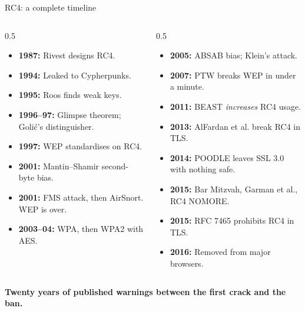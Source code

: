 \ifdefined\PRESENTATION\else\PassOptionsToClass{handout}{beamer}\fi\documentclass[aspectratio=169, lualatex]{beamer}
\begin{document}
\begin{frame}{RC4: a complete timeline}
	\begin{columns}[c]
		\begin{column}{0.5\textwidth}
			\begin{itemize}
				\item \textbf{1987:} Rivest designs RC4.
				\item \textbf{1994:} Leaked to Cypherpunks.
				\item \textbf{1995:} Roos finds weak keys.
				\item \textbf{1996--97:} Glimpse theorem; Goli\'{c}'s distinguisher.
				\item \textbf{1997:} WEP standardises on RC4.
				\item \textbf{2001:} Mantin--Shamir second-byte bias.
				\item \textbf{2001:} FMS attack, then AirSnort. WEP is over.
				\item \textbf{2003--04:} WPA, then WPA2 with AES.
			\end{itemize}
		\end{column}
		\begin{column}{0.5\textwidth}
			\begin{itemize}
				\item \textbf{2005:} ABSAB bias; Klein's attack.
				\item \textbf{2007:} PTW breaks WEP in under a minute.
				\item \textbf{2011:} BEAST \emph{increases} RC4 usage.
				\item \textbf{2013:} AlFardan et al. break RC4 in TLS.
				\item \textbf{2014:} POODLE leaves SSL 3.0 with nothing safe.
				\item \textbf{2015:} Bar Mitzvah, Garman et al., RC4 NOMORE.
				\item \textbf{2015:} RFC 7465 prohibits RC4 in TLS.
				\item \textbf{2016:} Removed from major browsers.
			\end{itemize}
		\end{column}
	\end{columns}
	\centering\textbf{Twenty years of published warnings between the first crack and the ban.}
	\vspace{-0.5em}
\end{frame}
\end{document}
